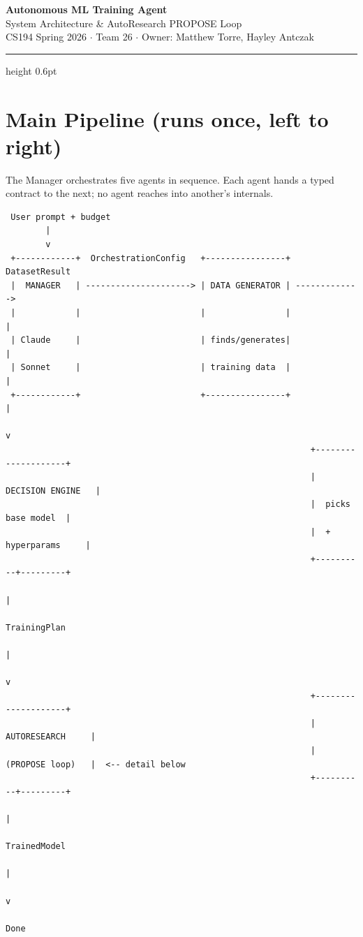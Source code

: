 \documentclass[11pt, letterpaper]{article}
\begin{document}
\begin{center}
  {\LARGE\bfseries\color{accent} Autonomous ML Training Agent}\\[4pt]
  {\large System Architecture \& AutoResearch PROPOSE Loop}\\[6pt]
  {\color{muted}\small CS194 Spring 2026 $\cdot$ Team 26 $\cdot$
  Owner: Matthew Torre, Hayley Antczak}
\end{center}

\vspace{0.5em}
\hrule height 0.6pt
\vspace{1.2em}

\section{Main Pipeline (runs once, left to right)}

The Manager orchestrates five agents in sequence. Each agent hands a typed
contract to the next; no agent reaches into another's internals.

\vspace{0.5em}
\begin{verbatim}
 User prompt + budget
        |
        v
 +------------+  OrchestrationConfig   +----------------+  DatasetResult
 |  MANAGER   | ---------------------> | DATA GENERATOR | ------------->
 |            |                        |                |               |
 | Claude     |                        | finds/generates|               |
 | Sonnet     |                        | training data  |               |
 +------------+                        +----------------+               |
                                                                        v
                                                             +--------------------+
                                                             |  DECISION ENGINE   |
                                                             |  picks base model  |
                                                             |  + hyperparams     |
                                                             +----------+---------+
                                                                        |
                                                                  TrainingPlan
                                                                        |
                                                                        v
                                                             +--------------------+
                                                             |   AUTORESEARCH     |
                                                             |   (PROPOSE loop)   |  <-- detail below
                                                             +----------+---------+
                                                                        |
                                                                  TrainedModel
                                                                        |
                                                                        v
                                                                    Done
\end{verbatim}
\end{document}
